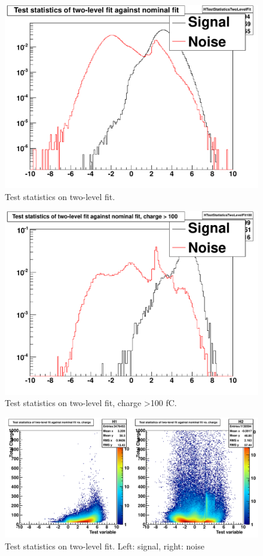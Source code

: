 \begin{figure}
\includegraphics[width=120mm]{DailyLog/6275/6275HTestStatisticsTwoLevelFit.pdf}
\caption{Test statistics on two-level fit.}
\label{Figure_6275HTestStatisticsTwoLevelFit}
\end{figure}

\begin{figure}
\includegraphics[width=120mm]{DailyLog/6275/6275HTestStatisticsTwoLevelFit100.pdf}
\caption{Test statistics on two-level fit, charge \textgreater 100 fC.}
\label{Figure_6275HTestStatisticsTwoLevelFit100}
\end{figure}

\begin{figure}
\includegraphics[width=120mm]{DailyLog/6275/6275HTestStatisticsTwoLevelFitVsCharge.pdf}
\caption{Test statistics on two-level fit.  Left: signal, right: noise}
\label{Figure_6275HTestStatisticsTwoLevelFitVsCharge}
\end{figure}

